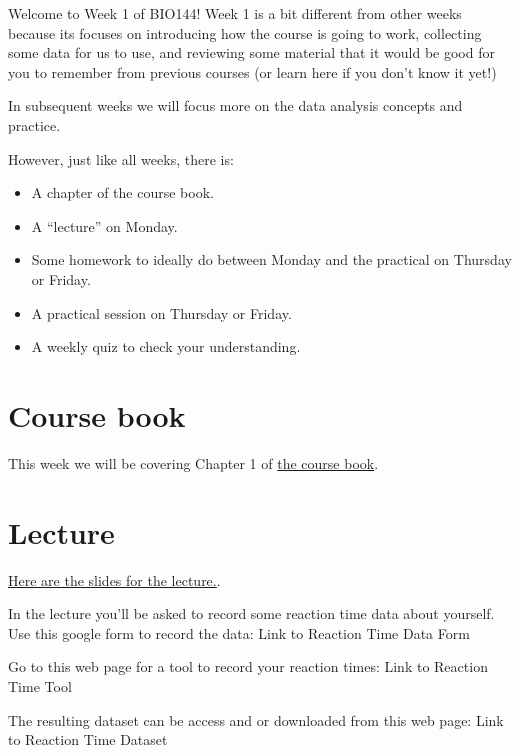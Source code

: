 \documentclass[
  letterpaper,
  8pt,
  a4paper]{book}
\providecommand{\tightlist}{%
  \setlength{\itemsep}{0pt}\setlength{\parskip}{0pt}}
\begin{document}

Welcome to Week 1 of BIO144! Week 1 is a bit different from other weeks
because its focuses on introducing how the course is going to work,
collecting some data for us to use, and reviewing some material that it
would be good for you to remember from previous courses (or learn here
if you don't know it yet!)

In subsequent weeks we will focus more on the data analysis concepts and
practice.

However, just like all weeks, there is:

\begin{itemize}
\tightlist
\item
  A chapter of the course book.
\item
  A ``lecture'' on Monday.
\item
  Some homework to ideally do between Monday and the practical on
  Thursday or Friday.
\item
  A practical session on Thursday or Friday.
\item
  A weekly quiz to check your understanding.
\end{itemize}

\section*{Course book}\label{course-book}


This week we will be covering Chapter 1 of
\href{https://opetchey.github.io/BIO144_Course_Book/}{the course book}.

\section*{Lecture}\label{lecture}


\href{assets/Week1_lecture_slides.pdf}{Here are the slides for the
lecture.}.

In the lecture you'll be asked to record some reaction time data about
yourself. Use this google form to record the data: Link to Reaction Time
Data Form

Go to this web page for a tool to record your reaction times: Link to
Reaction Time Tool

The resulting dataset can be access and or downloaded from this web
page: Link to Reaction Time Dataset
\end{document}
